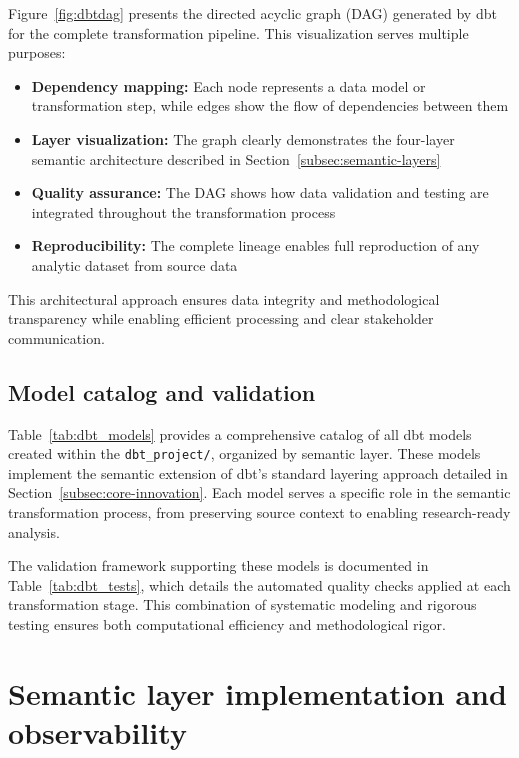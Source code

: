 \documentclass{article}
\begin{document}
Figure~\ref{fig:dbtdag} presents the directed acyclic graph (DAG) generated by dbt for the complete transformation pipeline. This visualization serves multiple purposes:

\begin{itemize}
    \item \textbf{Dependency mapping:} Each node represents a data model or transformation step, while edges show the flow of dependencies between them
    \item \textbf{Layer visualization:} The graph clearly demonstrates the four-layer semantic architecture described in Section~\ref{subsec:semantic-layers}
    \item \textbf{Quality assurance:} The DAG shows how data validation and testing are integrated throughout the transformation process
    \item \textbf{Reproducibility:} The complete lineage enables full reproduction of any analytic dataset from source data
\end{itemize}

This architectural approach ensures data integrity and methodological transparency while enabling efficient processing and clear stakeholder communication.

\subsection{Model catalog and validation}

Table~\ref{tab:dbt_models} provides a comprehensive catalog of all dbt models created within the \texttt{dbt\_project/}, organized by semantic layer. These models implement the semantic extension of dbt's standard layering approach detailed in Section~\ref{subsec:core-innovation}. Each model serves a specific role in the semantic transformation process, from preserving source context to enabling research-ready analysis.

The validation framework supporting these models is documented in Table~\ref{tab:dbt_tests}, which details the automated quality checks applied at each transformation stage. This combination of systematic modeling and rigorous testing ensures both computational efficiency and methodological rigor.



\section{Semantic layer implementation and observability}
\label{sec:semantic-implementation}
\end{document}

